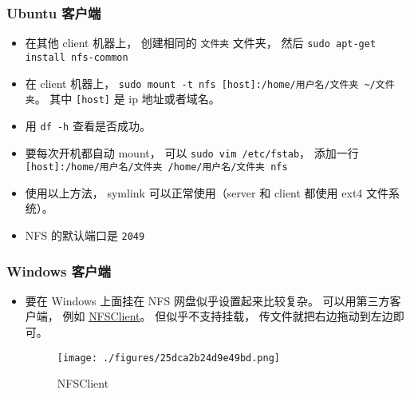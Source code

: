 \subsubsection{Ubuntu 客户端}
\begin{itemize}
\item 在其他 client 机器上， 创建相同的 \verb`文件夹` 文件夹， 然后 \verb`sudo apt-get install nfs-common`
\item 在 client 机器上， \verb`sudo mount -t nfs [host]:/home/用户名/文件夹 ~/文件夹`。 其中 \verb`[host]` 是 ip 地址或者域名。
\item 用 \verb`df -h` 查看是否成功。
\item 要每次开机都自动 mount， 可以 \verb`sudo vim /etc/fstab`， 添加一行 \verb`[host]:/home/用户名/文件夹 /home/用户名/文件夹 nfs`
\item 使用以上方法， symlink 可以正常使用（server 和 client 都使用 ext4 文件系统）。
\item NFS 的默认端口是 \verb`2049`
\end{itemize}

\subsubsection{Windows 客户端}
\begin{itemize}
\item 要在 Windows 上面挂在 NFS 网盘似乎设置起来比较复杂。 可以用第三方客户端， 例如 \href{https://sourceforge.net/projects/nfsclient/}{NFSClient}。 但似乎不支持挂载， 传文件就把右边拖动到左边即可。
\begin{figure}[ht]
\centering
\texttt{[image: ./figures/25dca2b24d9e49bd.png]}
\caption{NFSClient} \label{fig_NFS_1}
\end{figure}
\end{itemize}

